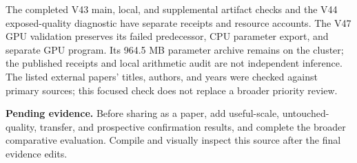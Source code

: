\documentclass[10pt,twocolumn,letterpaper]{article}
\newcommand{\pending}[1]{\par\noindent\textbf{Pending evidence.} #1\par}
\begin{document}
The completed V43 main, local, and supplemental artifact checks and the V44
exposed-quality diagnostic have separate receipts and resource accounts. The
V47 GPU validation preserves its failed predecessor, CPU parameter export, and
separate GPU program. Its 964.5 MB parameter archive remains on the cluster; the
published receipts and local arithmetic audit are not independent inference. The
listed external papers' titles, authors, and years were checked against primary
sources; this focused check does not replace a broader priority review.

\pending{Before sharing as a paper, add useful-scale, untouched-quality,
transfer, and prospective confirmation results, and complete the broader
comparative evaluation. Compile and visually inspect this source after the final
evidence edits.}
\end{document}
